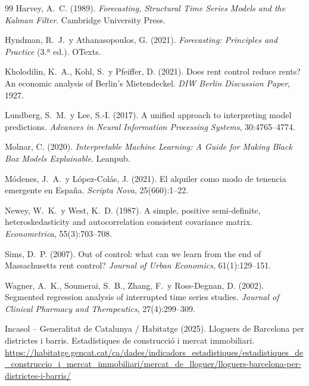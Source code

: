 \documentclass[10pt,a4paper,twocolumn]{article}
\begin{document}
\begin{thebibliography}{99}
Harvey, A.~C. (1989).
\textit{Forecasting, Structural Time Series Models and the Kalman Filter}.
Cambridge University Press.

Hyndman, R.~J.\ y Athanasopoulos, G. (2021).
\textit{Forecasting: Principles and Practice} (3.ª ed.).
OTexts.

Kholodilin, K.~A., Kohl, S.\ y Pfeiffer, D. (2021).
Does rent control reduce rents? An economic analysis of Berlin's Mietendeckel.
\textit{DIW Berlin Discussion Paper}, 1927.

Lundberg, S.~M.\ y Lee, S.-I. (2017).
A unified approach to interpreting model predictions.
\textit{Advances in Neural Information Processing Systems}, 30:4765--4774.

Molnar, C. (2020).
\textit{Interpretable Machine Learning: A Guide for Making Black Box Models
  Explainable}.
Leanpub.

Módenes, J.~A.\ y López-Colás, J. (2021).
El alquiler como modo de tenencia emergente en España.
\textit{Scripta Nova}, 25(660):1--22.

Newey, W.~K.\ y West, K.~D. (1987).
A simple, positive semi-definite, heteroskedasticity and autocorrelation
consistent covariance matrix.
\textit{Econometrica}, 55(3):703--708.

Sims, D.~P. (2007).
Out of control: what can we learn from the end of Massachusetts rent control?
\textit{Journal of Urban Economics}, 61(1):129--151.

Wagner, A.~K., Soumerai, S.~B., Zhang, F.\ y Ross-Degnan, D. (2002).
Segmented regression analysis of interrupted time series studies.
\textit{Journal of Clinical Pharmacy and Therapeutics}, 27(4):299--309.

{Incasol -- Generalitat de Catalunya / Habitatge} (2025).
Lloguers de Barcelona per districtes i barris.
Estadístiques de construcció i mercat immobiliari.
\url{https://habitatge.gencat.cat/ca/dades/indicadors_estadistiques/estadistiques_de_construccio_i_mercat_immobiliari/mercat_de_lloguer/lloguers-barcelona-per-districtes-i-barris/}


\end{thebibliography}
\end{document}
